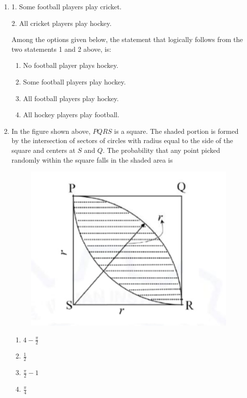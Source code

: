 \documentclass[journal,12pt,onecolumn]{article}
\theoremstyle{remark}
\begin{document}
\begin{enumerate}
\item 
1. Some football players play cricket.

2. All cricket players play hockey.

Among the options given below, the statement that logically follows from the two statements 1 and 2 above, is:

\hfill{}

\begin{enumerate}
    \item No football player plays hockey.
    \item Some football players play hockey.
    \item All football players play hockey.
    \item All hockey players play football.
\end{enumerate}

\item In the figure  shown above, $PQRS$ is a square. The shaded portion is formed by the intersection of sectors of circles with radius equal to the side of the square and centers at $S$ and $Q$.
The probability that any point picked randomly within the square falls in the shaded area is \underline{\hspace{2cm}}
\begin{figure}[H]
    \centering
    \includegraphics[width=0.7\columnwidth]{figs/2q9.jpg}
    \caption{}
    \label{fig:q9}
\end{figure}

\hfill{}

\begin{multicols}{2}
\begin{enumerate}
    \item $4-\frac{\pi}{2}$
    \item $\frac{1}{2}$
    \item $\frac{\pi}{2}-1$
    \item $\frac{\pi}{4}$
\end{enumerate}
\end{multicols}


\end{enumerate}
\end{document}
